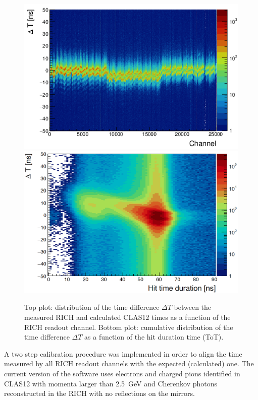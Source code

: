 \documentclass[5p,times,twocolumn]{elsarticle}
\begin{document}
\begin{figure}[t]
\begin{center}
\includegraphics[width=0.9\columnwidth]{dt_vs_anode_nocor.png}
\includegraphics[width=0.9\columnwidth]{dt_vs_dur_nocor.png}
\end{center}
\caption{Top plot: distribution of the time difference $\Delta T$ between the measured RICH and calculated CLAS12
  times as a function of the RICH readout channel. Bottom plot: cumulative distribution of the time difference
  $\Delta T$ as a function of the hit duration time (ToT).}
\label{fig:Time_uncorr}
\end{figure}

A two step calibration procedure was implemented in order to align the time measured by all RICH readout
channels with the expected (calculated) one. The current version of the software uses electrons and charged pions
identified in CLAS12 with momenta larger than 2.5~GeV and Cherenkov photons reconstructed in the RICH with
no reflections on the mirrors.
\end{document}
